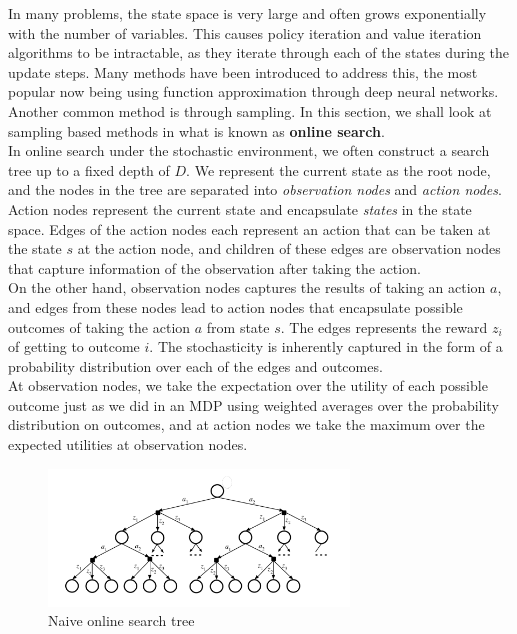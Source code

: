 \documentclass[11pt]{article}
\begin{document}
In many problems, the state space is very large and often grows exponentially with the number of variables. This causes policy iteration and value iteration algorithms to be intractable, as they iterate through each of the states during the update steps. Many methods have been introduced to address this, the most popular now being using function approximation through deep neural networks. Another common method is through sampling. In this section, we shall look at sampling based methods in what is known as \textbf{online search}.\\

In online search under the stochastic environment, we often construct a search tree up to a fixed depth of $D$. We represent the current state as the root node, and the nodes in the tree are separated into \textit{observation nodes} and \textit{action nodes}. Action nodes represent the current state and encapsulate \textit{states} in the state space. Edges of the action nodes each represent an action that can be taken at the state $s$ at the action node, and children of these edges are observation nodes that capture information of the observation after taking the action.\\

On the other hand, observation nodes captures the results of taking an action $a$, and edges from these nodes lead to action nodes that encapsulate possible outcomes of taking the action $a$ from state $s$. The edges represents the reward $z_i$ of getting to outcome $i$. The stochasticity is inherently captured in the form of a probability distribution over each of the edges and outcomes. \\

At observation nodes, we take the expectation over the utility of each possible outcome just as we did in an MDP using weighted averages over the probability distribution on outcomes, and at action nodes we take the maximum over the expected utilities at observation nodes.\\

\begin{figure}[!htb]
    \centering
    \includegraphics[width=8cm]{images/online-search-tree.png}
    \caption{Naive online search tree}
\end{figure}
\end{document}

